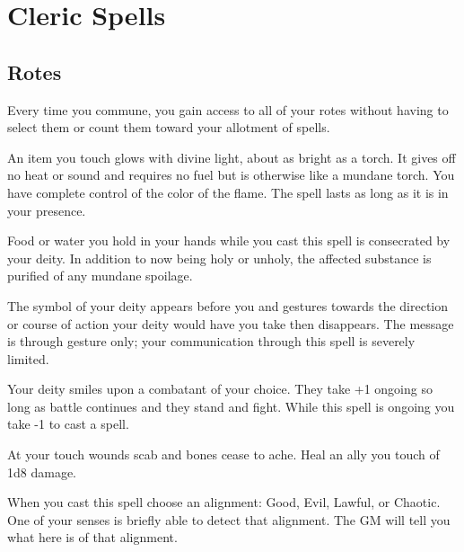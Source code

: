 \section{Cleric Spells}
\subsection{Rotes} 


 Every time you commune, you gain access to all of your rotes without having to select them or count them toward your allotment of spells.




 An item you touch glows with divine light, about as bright as a torch. It gives off no heat or sound and requires no fuel but is otherwise like a mundane torch. You have complete control of the color of the flame. The spell lasts as long as it is in your presence.




 Food or water you hold in your hands while you cast this spell is consecrated by your deity. In addition to now being holy or unholy, the affected substance is purified of any mundane spoilage.




 The symbol of your deity appears before you and gestures towards the direction or course of action your deity would have you take then disappears. The message is through gesture only; your communication through this spell is severely limited.





 Your deity smiles upon a combatant of your choice. They take +1 ongoing so long as battle continues and they stand and fight. While this spell is ongoing you take -1 to cast a spell.




 At your touch wounds scab and bones cease to ache. Heal an ally you touch of 1d8 damage.




 When you cast this spell choose an alignment: Good, Evil, Lawful, or Chaotic. One of your senses is briefly able to detect that alignment. The GM will tell you what here is of that alignment.





